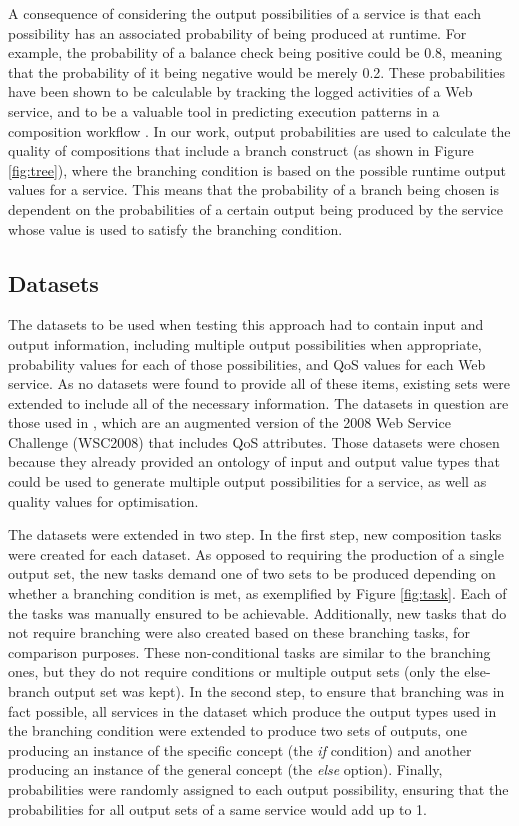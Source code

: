 \documentclass[conference]{IEEEtran}
\begin{document}
A consequence of considering the output possibilities of a service is that each possibility has an associated probability of being produced at runtime. For example, the probability of a balance check being positive could be 0.8, meaning that the probability of it being negative would be merely 0.2. These probabilities have been shown to be calculable by tracking the logged activities of a Web service, and to be a valuable tool in predicting execution patterns in a composition workflow \cite{clarke2014modelling}. In our work, output probabilities are used to calculate the quality of compositions that include a branch construct (as shown in Figure \ref{fig:tree}), where the branching condition is based on the possible runtime output values for a service. This means that the probability of a branch being chosen is dependent on the probabilities of a certain output being produced by the service whose value is used to satisfy the branching condition.

\subsection{Datasets}
The datasets to be used when testing this approach had to contain input and output information, including multiple output possibilities when appropriate, probability values for each of those possibilities, and QoS values for each Web service. As no datasets were found to provide all of these items, existing sets were extended to include all of the necessary information. The datasets in question are those used in \cite{wang2013genetic}, which are an augmented version of the 2008 Web Service Challenge (WSC2008) \cite{bansal2008wsc} that includes QoS attributes. Those datasets were chosen because they already provided an ontology of input and output value types that could be used to generate multiple output possibilities for a service, as well as quality values for optimisation.

The datasets were extended in two step. In the first step, new composition tasks were created for each dataset. As opposed to requiring the production of a single output set, the new tasks demand one of two sets to be produced depending on whether a branching condition is met, as exemplified by Figure \ref{fig:task}. Each of the tasks was manually ensured to be achievable. Additionally, new tasks that do not require branching were also created based on these branching tasks, for comparison purposes. These non-conditional tasks are similar to the branching ones, but they do not require conditions or multiple output sets (only the else-branch output set was kept). In the second step, to ensure that branching was in fact possible, all services in the dataset which produce the output types used in the branching condition were extended to produce two sets of outputs, one producing an instance of the specific concept (the \textit{if} condition) and another producing an instance of the general concept (the \textit{else} option). Finally, probabilities were randomly assigned to each output possibility, ensuring that the probabilities for all output sets of a same service would add up to 1.
\end{document}
